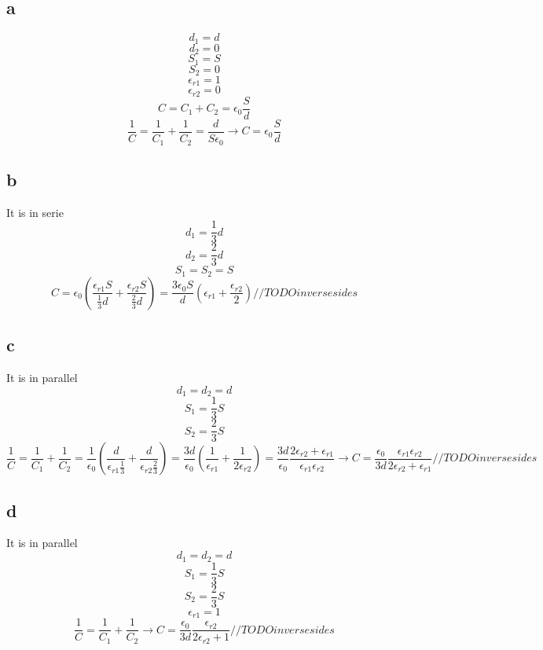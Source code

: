 \documentclass{article}
\begin{document}
\subsection{a}
\[
	d_1 = d
\]
\[
	d_2 = 0
\]
\[
	S_1 = S
\]
\[
	S_2 = 0
\]
\[
	\epsilon_{r1} = 1
\]
\[
	\epsilon_{r2} = 0
\]
\[
	C = C_1 + C_2 = \epsilon_0 \frac{S}{d}
\]
\[
	\frac{1}{C} = \frac{1}{C_1} + \frac{1}{C_2}
	= \frac{d}{S \epsilon_0}
	\to C = \epsilon_0 \frac{S}{d}
\]

\subsection{b}
It is in serie
\[
	d_1 = \frac{1}{3} d
\]
\[
	d_2 = \frac{2}{3} d
\]
\[
	S_1 = S_2 = S
\]
\[
	C = \epsilon_0
	( \frac{\epsilon_{r1} S}{\frac{1}{3} d} +
	\frac{\epsilon_{r2} S}{\frac{2}{3} d} )
	= \frac{3 \epsilon_0 S}{d}
	( \epsilon_{r1} + \frac{\epsilon_{r2}}{2} )
	// TODO inverse sides
\]

\subsection{c}
It is in parallel
\[
	d_1 = d_2 = d
\]
\[
	S_1 = \frac{1}{3} S
\]
\[
	S_2 = \frac{2}{3} S
\]
\[
	\frac{1}{C} = \frac{1}{C_1} + \frac{1}{C_2}
	= \frac{1}{\epsilon_0}
	( \frac{d}{\epsilon_{r1} \frac{1}{3}} +
	\frac{d}{\epsilon_{r2} \frac{2}{3}} )
	= \frac{3 d}{\epsilon_0}
	( \frac{1}{\epsilon_{r1}} +
	\frac{1}{2 \epsilon_{r2}} )
	= \frac{3 d}{\epsilon_0}
	\frac{2 \epsilon_{r2} + \epsilon_{r1}}{\epsilon_{r1} \epsilon_{r2}}
	\to C = \frac{\epsilon_0}{3 d}
	\frac{\epsilon_{r1} \epsilon_{r2}}{2 \epsilon_{r2} + \epsilon_{r1}}
	// TODO inverse sides
\]

\subsection{d}
It is in parallel
\[
	d_1 = d_2 = d
\]
\[
	S_1 = \frac{1}{3} S
\]
\[
	S_2 = \frac{2}{3} S
\]
\[
	\epsilon_{r1} = 1
\]
\[
	\frac{1}{C} = \frac{1}{C_1} + \frac{1}{C_2}
	\to C = \frac{\epsilon_0}{3 d}
	\frac{\epsilon_{r2}}{2 \epsilon_{r2} + 1}
	// TODO inverse sides
\]
\end{document}
